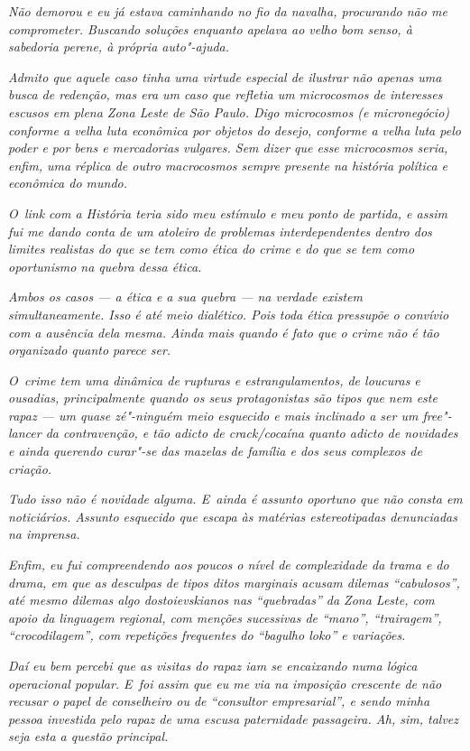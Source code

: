 \emph{Não demorou e eu já estava caminhando no fio da navalha,
procurando não me comprometer. Buscando soluções enquanto apelava ao
velho bom senso, à sabedoria perene, à própria auto"-ajuda.}~

\emph{Admito que aquele caso tinha uma virtude especial de ilustrar não
apenas uma busca de redenção, mas era um caso que refletia um
microcosmos de interesses escusos em plena Zona Leste de São Paulo. Digo
microcosmos (e micronegócio) conforme a velha luta econômica por objetos
do desejo, conforme a velha luta pelo poder e por bens e mercadorias
vulgares. Sem dizer que esse microcosmos seria, enfim, uma réplica de
outro macrocosmos sempre presente na história política e econômica do
mundo.}~

\emph{O~link com a História teria sido meu estímulo e meu ponto de
partida, e assim fui me dando conta de um atoleiro de problemas
interdependentes dentro dos limites realistas do que se tem como ética
do crime e do que se tem como oportunismo na quebra dessa ética.}~

\emph{Ambos os casos --- a ética e a sua quebra --- na verdade existem
simultaneamente. Isso é até meio dialético. Pois toda ética pressupõe o
convívio com a ausência dela mesma. Ainda mais quando é fato que o crime
não é tão organizado quanto parece ser.}~

\emph{O~crime tem uma dinâmica de rupturas e estrangulamentos, de
loucuras e ousadias, principalmente quando os seus protagonistas são
tipos que nem este rapaz --- um quase zé"-ninguém meio esquecido e mais
inclinado a ser um free"-lancer da contravenção, e tão adicto de
crack/cocaína quanto adicto de novidades e ainda querendo curar"-se das
mazelas de família e dos seus complexos de criação.}~

\emph{Tudo isso não é novidade alguma. E~ainda é assunto oportuno que
não consta em noticiários. Assunto esquecido que escapa às matérias
estereotipadas denunciadas na imprensa.}

\emph{Enfim, eu fui compreendendo aos poucos o nível de complexidade da
trama e do drama, em que as desculpas de tipos ditos marginais acusam
dilemas ``cabulosos'', até mesmo dilemas algo dostoievskianos nas
``quebradas'' da Zona Leste, com apoio da linguagem regional, com
menções sucessivas de ``mano'', ``trairagem'', ``crocodilagem'', com
repetições frequentes do ``bagulho loko'' e variações.}~

\emph{Daí eu bem percebi que as visitas do rapaz iam se encaixando numa
lógica operacional popular. E~foi assim que eu me via na imposição
crescente de não recusar o papel de conselheiro ou de ``consultor
empresarial'', e sendo minha pessoa investida pelo rapaz de uma escusa
paternidade passageira. Ah, sim, talvez seja esta a questão principal.}~

